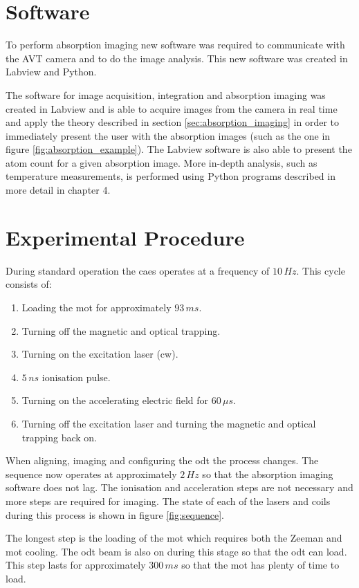 \section{Software}

To perform absorption imaging new software was required to communicate with the AVT camera and to do the image analysis. This new software was created in Labview and Python.

The software for image acquisition, integration and absorption imaging was created in Labview and is able to acquire images from the camera in real time and apply the theory described in section \ref{sec:absorption_imaging} in order to immediately present the user with the absorption images (such as the one in figure \ref{fig:absorption_example}). The Labview software is also able to present the atom count for a given absorption image. More in-depth analysis, such as temperature measurements, is performed using Python programs described in more detail in chapter 4.

\section{Experimental Procedure}

During standard operation the \gls{caes} operates at a frequency of $10\,\unit{Hz}$. This cycle consists of:
\begin{enumerate}
\item Loading  the \gls{mot} for approximately $93\,\unit{ms}$.
\item Turning off the magnetic and optical trapping.
\item Turning on the excitation laser (\gls{cw}).
\item $5\,\unit{ns}$ ionisation pulse.
\item Turning on the accelerating electric field for $60\,\unit{\mu s}$.
\item Turning off the excitation laser and turning the magnetic and optical trapping back on.
\end{enumerate}

When aligning, imaging and configuring the \gls{odt} the process changes. The sequence now operates at approximately $2\,\unit{Hz}$ so that the absorption imaging software does not lag. The ionisation and acceleration steps are not necessary and more steps are required for imaging. The state of each of the lasers and coils during this process is shown in figure \ref{fig:sequence}.

The longest step is the loading of the \gls{mot} which requires both the Zeeman and \gls{mot} cooling. The \gls{odt} beam is also on during this stage so that the \gls{odt} can load. This step lasts for approximately $300\,\unit{ms}$ so that the \gls{mot} has plenty of time to load. 

